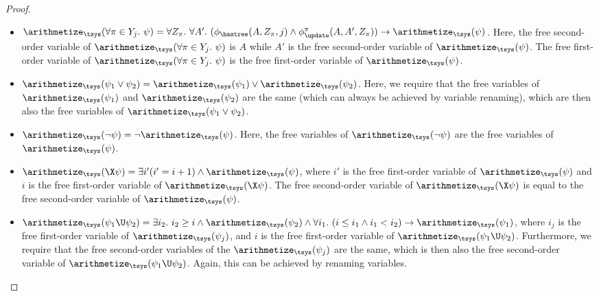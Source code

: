 \begin{proof}
\begin{itemize}
    Here, the free second-order variable of $\arithmetize_\tsys(\exists\pi\in Y_j.\ \psi)$ is $A$ while $A'$ is the free second-order variable of $\arithmetize_\tsys(\psi)$. The free first-order variable of $\arithmetize_\tsys(\exists\pi\in Y_j.\ \psi)$ is the free first-order variable of $\arithmetize_\tsys(\psi)$.


    \item $\arithmetize_\tsys(\forall\pi\in Y_j.\ \psi) = \forall Z_\pi.\ \forall A'.\ (\phi_\hastree(A,Z_\pi,j) \wedge \phi_\update^\pi(A,A',Z_\pi) )\rightarrow \arithmetize_\tsys(\psi)$.
    Here, the free second-order variable of $\arithmetize_\tsys(\forall\pi\in Y_j.\ \psi)$ is $A$ while $A'$ is the free second-order variable of $\arithmetize_\tsys(\psi)$. The free first-order variable of $\arithmetize_\tsys(\forall\pi\in Y_j.\ \psi)$ is the free first-order variable of $\arithmetize_\tsys(\psi)$.

    
    \item $\arithmetize_\tsys(\psi_1 \vee \psi_2) = \arithmetize_\tsys(\psi_1) \vee \arithmetize_\tsys(\psi_2)$. Here, we require that the free variables of $\arithmetize_\tsys(\psi_1)$ and $\arithmetize_\tsys(\psi_2)$ are the same (which can always be achieved by variable renaming), which are then also the free variables of $\arithmetize_\tsys(\psi_1 \vee \psi_2)$. 
    
    \item $\arithmetize_\tsys(\neg\psi) = \neg\arithmetize_\tsys(\psi)$. Here, the free variables of $\arithmetize_\tsys(\neg\psi) $ are the free variables of $ \arithmetize_\tsys(\psi)$.
    
     \item $\arithmetize_\tsys(\X\psi) =  \exists i' (i' = i+1) \wedge \arithmetize_\tsys(\psi)$, where $i'$ is the free first-order variable of $\arithmetize_\tsys(\psi)$ and $i$ is the free first-order variable of $\arithmetize_\tsys(\X\psi)$.
     The free second-order variable of $\arithmetize_\tsys(\X\psi)$ is equal to the free second-order variable of $\arithmetize_\tsys(\psi)$.
    
    \item $\arithmetize_\tsys(\psi_1\U\psi_2) =  \exists i_2.\ i_2 \ge i \wedge \arithmetize_\tsys(\psi_2) \wedge \forall i_1.\ (i \le i_1 \wedge i_1 < i_2) \rightarrow \arithmetize_\tsys(\psi_1)$, where $i_j$ is the free first-order variable of $\arithmetize_\tsys(\psi_j)$, %
    and $i$ is the free first-order variable of $\arithmetize_\tsys(\psi_1\U\psi_2)$.
    Furthermore, we require that the free second-order variables of the $\arithmetize_\tsys(\psi_j)$ are the same, which is then also the free second-order variable of $\arithmetize_\tsys(\psi_1\U\psi_2)$. Again, this can be achieved by renaming variables.


\end{itemize}
\end{proof}
